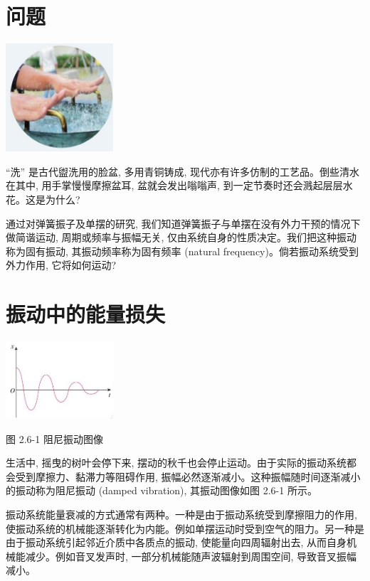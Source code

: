 \documentclass[10pt]{article}
\begin{document}
\section*{问题}

\begin{center}
\includegraphics[max width=0.3\textwidth]{images/01910e4c-ebb8-7d2c-8f2f-2375bc1d2d12_59_677386.jpg}
\end{center}

“洗” 是古代盥洗用的脸盆, 多用青铜铸成, 现代亦有许多仿制的工艺品。倒些清水在其中, 用手掌慢慢摩擦盆耳, 盆就会发出嗡嗡声, 到一定节奏时还会溅起层层水花。这是为什么?

通过对弹簧振子及单摆的研究, 我们知道弹簧振子与单摆在没有外力干预的情况下做简谐运动, 周期或频率与振幅无关, 仅由系统自身的性质决定。我们把这种振动称为固有振动, 其振动频率称为固有频率 (natural frequency)。倘若振动系统受到外力作用, 它将如何运动?

\section*{振动中的能量损失}

\begin{center}
\includegraphics[max width=0.3\textwidth]{images/01910e4c-ebb8-7d2c-8f2f-2375bc1d2d12_59_194703.jpg}
\end{center}

图 2.6-1 阻尼振动图像

生活中, 摇曳的树叶会停下来, 摆动的秋千也会停止运动。由于实际的振动系统都会受到摩擦力、黏滞力等阻碍作用, 振幅必然逐渐减小。这种振幅随时间逐渐减小的振动称为阻尼振动 (damped vibration), 其振动图像如图 2.6-1 所示。

振动系统能量衰减的方式通常有两种。一种是由于振动系统受到摩擦阻力的作用, 使振动系统的机械能逐渐转化为内能。例如单摆运动时受到空气的阻力。另一种是由于振动系统引起邻近介质中各质点的振动, 使能量向四周辐射出去, 从而自身机械能减少。例如音叉发声时, 一部分机械能随声波辐射到周围空间, 导致音叉振幅减小。
\end{document}
